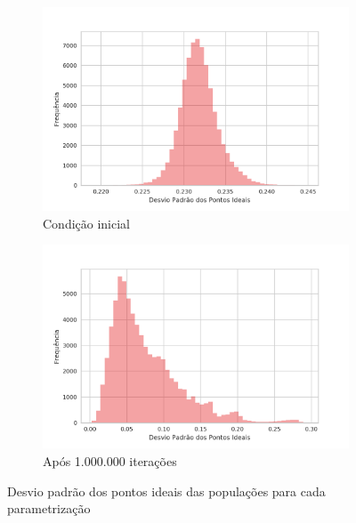 \begin{figure}[h]
    \centering
    \begin{subfigure}[b]{0.49\textwidth}
      \includegraphics[width=\textwidth]{ims/diststdinit.png}
      \caption{Condição inicial}
    \end{subfigure}
    \begin{subfigure}[b]{0.49\textwidth}
      \includegraphics[width=\textwidth]{ims/distY.png}
       \caption{Após 1.000.000 iterações}
      \end{subfigure}
      \caption{Desvio padrão dos pontos ideais das populações para cada parametrização}
      \label{fig:hists1}
    \end{figure}
    

%
%

